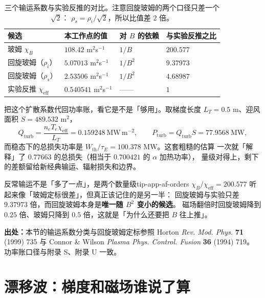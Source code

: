 \begin{table}[htbp]
\centering
\small
\caption{三个输运系数与实验反推的对比。注意回旋玻姆的两个口径只差一个 $\sqrt{2}$：
$\rho_s=\rho_i/\sqrt{2}$，所以比值差 $2$ 倍。}
\label{tab:app-af-scales}
\begin{tabular}{p{3.0cm}p{3.0cm}p{3.2cm}p{4.0cm}}
\toprule
候选 & 本工作点的值 & 对 $B$ 的依赖 & 与实验反推之比 \\
\midrule
玻姆 $\chi_B$ & $108.42$ m$^2$s$^{-1}$ & $1/B$ & $200.577$ \\
回旋玻姆（$\rho_i$） & $5.07013$ m$^2$s$^{-1}$ & $1/B^2$ & $9.37973$ \\
回旋玻姆（$\rho_s$） & $2.53506$ m$^2$s$^{-1}$ & $1/B^2$ & $4.68987$ \\
实验反推 $\chi_{\mathrm{eff}}$ & $0.540541$ m$^2$s$^{-1}$ & —— & $1$ \\
\bottomrule
\end{tabular}

\end{table}

把这个扩散系数代回功率账，看它是不是「够用」。取梯度长度 $L_T=0.5$ m、迎风面积 $S=489.532$ m$^2$，
\begin{equation}
Q_{\mathrm{turb}}=\frac{n_eT_e\chi_{\mathrm{eff}}}{L_T}
=0.159248\ \mathrm{MW\,m^{-2}},
\qquad
P_{\mathrm{turb}}=Q_{\mathrm{turb}}S=77.9568\ \mathrm{MW},
\label{eq:app-af-q}
\end{equation}
而稳态下的总损失功率是 $W_{\mathrm{th}}/\tau_E=100.378$ MW。这套粗糙的估算
一次就「解释」了 $0.77663$ 的总损失（相当于 $0.700421$ 的 $\alpha$ 加热功率），
量级对得上，剩下的差额留给新经典输运、辐射损失和边界。

\begin{tip}{反常输运不是「多了一点」，是两个数量级}{tip-app-af-orders}
$\chi_B/\chi_{\mathrm{eff}}=200.577$ 听起来像「玻姆定标很差」，但真正该记住的是另一半：
回旋玻姆与实验只差 $9.37973$ 倍，而回旋玻姆本身是\textbf{唯一随 $B^2$ 变小的候选}。
磁场翻倍时回旋玻姆降到 $0.25$ 倍、玻姆只降到 $0.5$ 倍，这就是「为什么还要把 $B$ 往上推」。
\end{tip}

{\footnotesize
\textbf{出处：}本节的输运系数分类与回旋玻姆定标参照 Horton \emph{Rev. Mod. Phys.} \textbf{71} (1999) 735 与
Connor \& Wilson \emph{Plasma Phys. Control. Fusion} \textbf{36} (1994) 719。
功率账口径与附录 S、附录 U 一致。
}

\section{漂移波：梯度和磁场谁说了算}
\label{sec:app-af-driftwave}

